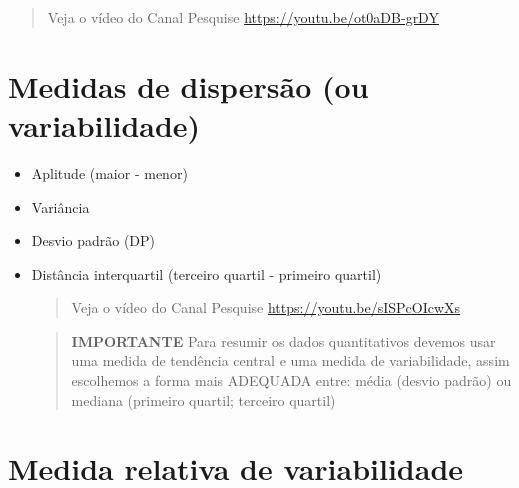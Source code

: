 \documentclass[
]{book}
\begin{document}
\begin{quote}
Veja o vídeo do Canal Pesquise \url{https://youtu.be/ot0aDB-grDY}
\end{quote}

\hypertarget{medidas-de-dispersuxe3o-ou-variabilidade}{%
\section{Medidas de dispersão (ou variabilidade)}\label{medidas-de-dispersuxe3o-ou-variabilidade}}

\begin{itemize}
\item
  Aplitude (maior - menor)
\item
  Variância
\item
  Desvio padrão (DP)
\item
  Distância interquartil (terceiro quartil - primeiro quartil)

  \begin{quote}
  Veja o vídeo do Canal Pesquise \url{https://youtu.be/sISPcOIcwXs}
  \end{quote}

  \begin{quote}
  \textbf{IMPORTANTE} Para resumir os dados quantitativos devemos usar uma medida de tendência central e uma medida de variabilidade, assim escolhemos a forma mais ADEQUADA entre:
  média (desvio padrão) ou
  mediana (primeiro quartil; terceiro quartil)
  \end{quote}
\end{itemize}

\hypertarget{medida-relativa-de-variabilidade}{%
\section{Medida relativa de variabilidade}\label{medida-relativa-de-variabilidade}}
\end{document}
